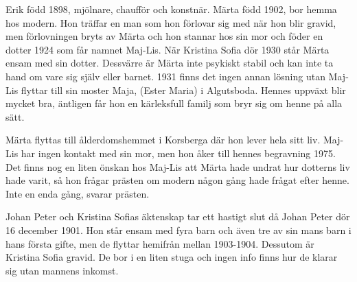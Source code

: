 Erik född 1898, mjölnare, chaufför och konstnär. Märta född 1902, bor hemma hos modern. Hon träffar en man som hon förlovar sig med när hon blir gravid, men förlovningen bryts av Märta och hon stannar hos sin mor och föder en dotter 1924 som får namnet Maj-Lis. När Kristina Sofia dör 1930 står Märta ensam med sin dotter. Dessvärre är Märta inte psykiskt stabil och kan inte ta hand om vare sig själv eller barnet. 1931 finns det ingen annan lösning utan Maj-Lis flyttar till sin moster Maja, (Ester Maria) i Algutsboda. Hennes uppväxt blir mycket bra, äntligen får hon en kärleksfull familj som bryr sig om henne på alla sätt.

Märta flyttas till ålderdomshemmet i Korsberga där hon lever hela sitt liv.
Maj-Lis har ingen kontakt med sin mor, men hon åker till hennes begravning 1975. Det finns nog en liten önskan hos Maj-Lis att Märta hade undrat hur dotterns liv hade varit, så hon frågar prästen om modern någon gång hade frågat efter henne. Inte en enda gång, svarar prästen.

Johan Peter och Kristina Sofias äktenskap tar ett hastigt slut då Johan Peter dör 16 december 1901.
Hon står ensam med fyra barn och även tre av sin mans barn i hans första gifte, men de flyttar hemifrån mellan 1903-1904.  Dessutom är Kristina Sofia gravid. De bor i en liten stuga och ingen info finns hur de klarar sig utan mannens inkomst.

